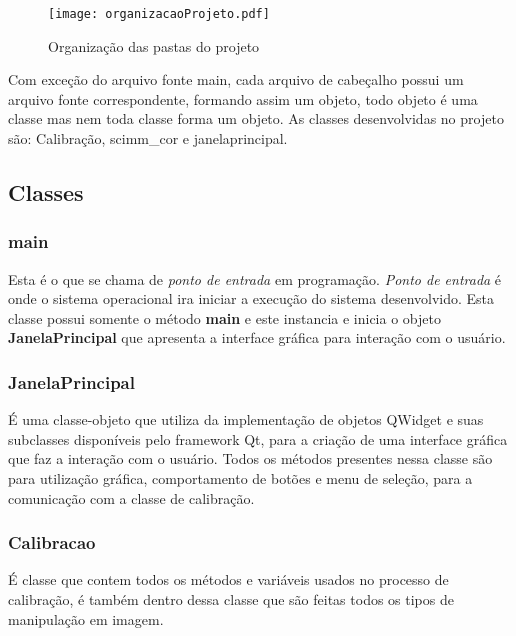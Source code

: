 	\begin{figure}[!h]
		\centering
		\texttt{[image: organizacaoProjeto.pdf]}
		\caption{Organização das pastas do projeto}
		\label{Organizacao do Projeto}
	\end{figure}
	Com exceção do arquivo fonte main, cada arquivo de cabeçalho possui um arquivo fonte correspondente, formando assim um objeto, todo objeto é uma classe mas nem toda classe forma um objeto. As classes desenvolvidas no projeto são: Calibração, scimm\_cor e janelaprincipal.

\subsection{Classes}
\subsubsection{main}
 Esta é o que se chama de \textit{ponto de entrada} em programação. \textit{Ponto de entrada} é onde o sistema operacional ira iniciar a execução do sistema desenvolvido. Esta classe possui somente o método \textbf{main} e este instancia e inicia o objeto \textbf{JanelaPrincipal} que apresenta a interface gráfica para interação com o usuário.
 
\subsubsection{JanelaPrincipal}
É uma classe-objeto que utiliza da implementação de objetos QWidget e suas subclasses disponíveis pelo framework Qt, para a criação de uma interface gráfica que faz a interação com o usuário. Todos os métodos presentes nessa classe são para utilização gráfica, comportamento de botões e menu de seleção, para a comunicação com a classe de calibração.	

\subsubsection{Calibracao}
 É classe que contem todos os métodos e variáveis usados no processo de calibração, é também dentro dessa classe que são feitas todos os tipos de manipulação em imagem.
 
